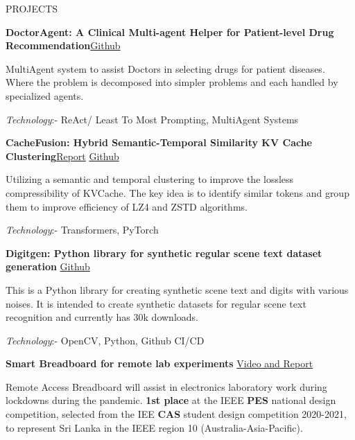 \documentclass{resume} %
\begin{document}
\begin{rSection}{PROJECTS}
\vspace{-1.25em}

\item \textbf{DoctorAgent: A Clinical Multi-agent Helper for Patient-level Drug
Recommendation}\hfill \href{https://github.com/DevinDeSilva/DoctorAssist}{Github}

MultiAgent system to assist Doctors in selecting drugs for patient diseases. Where the problem is decomposed into simpler problems and each handled by specialized agents.

\textit{Technology}:- ReAct/ Least To Most Prompting, MultiAgent Systems 

\item \textbf{CacheFusion: Hybrid Semantic-Temporal Similarity
KV Cache Clustering}\hfill \href{https://rpiexchange-my.sharepoint.com/:b:/g/personal/desild_rpi_edu/ESXEKPhdWvtHsWfQy-i_tjcBM3565gBZCgLQKYc3wChb5Q?e=f4u2hR}{Report}
\hspace{2mm}
\href{https://github.com/CDFire/CacheFusion}{Github}

Utilizing a semantic and temporal clustering to improve the lossless compressibility of KVCache. The key idea is to identify similar tokens and group them to improve efficiency of LZ4 and ZSTD algorithms.

\textit{Technology}:- Transformers, PyTorch

\item \textbf{Digitgen: Python library for synthetic regular scene text dataset generation }\hfill \href{https://github.com/ACRA-FL/digitgen}{Github}

This is a Python library for creating synthetic scene text and digits with various noises. It is intended to create synthetic datasets for regular scene text recognition and currently has 30k downloads.

\textit{Technology}:- OpenCV, Python, Github CI/CD
\item \textbf{Smart Breadboard for remote lab experiments }\hfill \href{https://drive.google.com/drive/u/0/folders/1xaSNThewvvsGVQ5pdaWTqzAHVvRtRN91}{Video and Report}

Remote Access Breadboard will assist in electronics laboratory work during lockdowns during the pandemic. {\bf 1st place} at the IEEE {\bf PES} national design competition, selected from the IEE {\bf CAS} student design competition 2020-2021, to represent Sri Lanka in the IEEE region 10 (Australia-Asia-Pacific).


\end{rSection}
\end{document}
